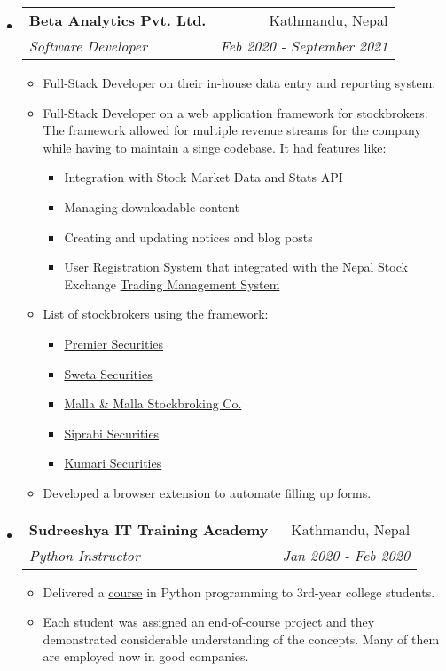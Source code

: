 \documentclass[letterpaper,11pt]{article}
\makeatletter
\newcommand{\cvsubheading}[4]{
\begin{tabular*}{6.5in}{l@{\cftdotfill{\cftsecdotsep}\extracolsep{\fill}}r}
        \textbf{#1} & #2 \\
        \textit{#3} & \textit{#4} \\
\end{tabular*}\vspace{-6pt}}
\newcommand{\cvitem}[1]{\item #1 \vspace{-2pt}}
\makeatother
\begin{document}
\begin{itemize}
      \item
            \cvsubheading{Beta Analytics Pvt. Ltd.}{Kathmandu, Nepal}{Software Developer}{Feb 2020 - September 2021}
            \begin{itemize}
                  \cvitem{Full-Stack Developer on their in-house data entry and reporting system.}
                  \cvitem{
                        Full-Stack Developer on a web application framework for stockbrokers. The framework allowed for multiple revenue streams for the company while having to maintain a singe codebase. It had features like:
                        \begin{itemize}
                              \item Integration with Stock Market Data and Stats API
                              \item Managing downloadable content
                              \item Creating and updating notices and blog posts
                              \item User Registration System that integrated with the Nepal Stock Exchange \href{https://tms01.nepsetms.com.np/}{Trading Management System}
                        \end{itemize}
                  }
                  \cvitem{
                        List of stockbrokers using the framework:
                        \begin{itemize}
                              \item \href{https://www.premiersecurities.com.np/}{Premier Securities}
                              \item \href{https://www.swetasecurities.com/}{Sweta Securities}
                              \item \href{https://mallastock.com/}{Malla \& Malla Stockbroking Co.}
                              \item \href{https://siprabi.com/}{Siprabi Securities}
                              \item \href{https://kumarisecurities.com/}{Kumari Securities}
                        \end{itemize}
                  }
                  
                  \cvitem{Developed a browser extension to automate filling up forms.}
            \end{itemize}
            
      \item
            \cvsubheading{Sudreeshya IT Training Academy}{Kathmandu, Nepal}{Python Instructor}{Jan 2020 - Feb 2020}
            \begin{itemize}
                  \cvitem{Delivered a \href{https://github.com/leabstrait/basic-python-class}{course} in Python programming to 3rd-year college students.}
                  \cvitem{Each student was assigned an end-of-course project and they demonstrated considerable understanding of the concepts. Many of them are employed now in good companies.}
            \end{itemize}
            

\end{itemize}
\end{document}
